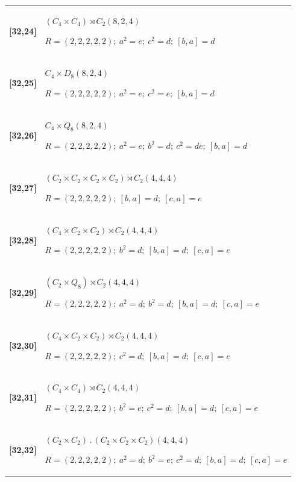\documentclass[UTF8,fontset=fandol,11pt,a4paper]{ctexart}
\begin{document}
\begin{longtable}{@{}p{17mm}>{\raggedright\arraybackslash}p{141mm}@{}}
\textbf{[32,24]} & $(C_{4}\times C_{4})\rtimes C_{2}$\quad $(8,2,4)$\par\(R=(2,2,2,2,2);\allowbreak\ a^{2}=e;\allowbreak\ c^{2}=d;\allowbreak\ [b,a]=d\)\\[3pt]

\textbf{[32,25]} & $C_{4}\times D_{8}$\quad $(8,2,4)$\par\(R=(2,2,2,2,2);\allowbreak\ a^{2}=e;\allowbreak\ c^{2}=e;\allowbreak\ [b,a]=d\)\\[3pt]

\textbf{[32,26]} & $C_{4}\times Q_{8}$\quad $(8,2,4)$\par\(R=(2,2,2,2,2);\allowbreak\ a^{2}=e;\allowbreak\ b^{2}=d;\allowbreak\ c^{2}=de;\allowbreak\ [b,a]=d\)\\[3pt]

\textbf{[32,27]} & $(C_{2}\times C_{2}\times C_{2}\times C_{2})\rtimes C_{2}$\quad $(4,4,4)$\par\(R=(2,2,2,2,2);\allowbreak\ [b,a]=d;\allowbreak\ [c,a]=e\)\\[3pt]

\textbf{[32,28]} & $(C_{4}\times C_{2}\times C_{2})\rtimes C_{2}$\quad $(4,4,4)$\par\(R=(2,2,2,2,2);\allowbreak\ b^{2}=d;\allowbreak\ [b,a]=d;\allowbreak\ [c,a]=e\)\\[3pt]

\textbf{[32,29]} & $(C_{2}\times Q_{8})\rtimes C_{2}$\quad $(4,4,4)$\par\(R=(2,2,2,2,2);\allowbreak\ a^{2}=d;\allowbreak\ b^{2}=d;\allowbreak\ [b,a]=d;\allowbreak\ [c,a]=e\)\\[3pt]

\textbf{[32,30]} & $(C_{4}\times C_{2}\times C_{2})\rtimes C_{2}$\quad $(4,4,4)$\par\(R=(2,2,2,2,2);\allowbreak\ c^{2}=d;\allowbreak\ [b,a]=d;\allowbreak\ [c,a]=e\)\\[3pt]

\textbf{[32,31]} & $(C_{4}\times C_{4})\rtimes C_{2}$\quad $(4,4,4)$\par\(R=(2,2,2,2,2);\allowbreak\ b^{2}=e;\allowbreak\ c^{2}=d;\allowbreak\ [b,a]=d;\allowbreak\ [c,a]=e\)\\[3pt]

\textbf{[32,32]} & $(C_{2}\times C_{2})\mathbin{.} (C_{2}\times C_{2}\times C_{2})$\quad $(4,4,4)$\par\(R=(2,2,2,2,2);\allowbreak\ a^{2}=d;\allowbreak\ b^{2}=e;\allowbreak\ c^{2}=d;\allowbreak\ [b,a]=d;\allowbreak\ [c,a]=e\)\\[3pt]


\end{longtable}
\end{document}
